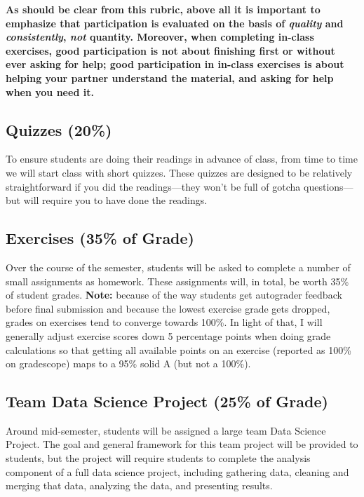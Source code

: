 \documentclass[12pt]{article}
\begin{document}
\textbf{As should be clear from this rubric, above all it is important to emphasize that participation is evaluated on the basis of \emph{quality} and \emph{consistently}, \emph{not} quantity. Moreover, when completing in-class exercises, good participation is not about finishing first or without ever asking for help; good participation in in-class exercises is about helping your partner understand the material, and asking for help when you need it.}

\subsection{Quizzes (20\%)}

To ensure students are doing their readings in advance of class, from time to time we will start class with short quizzes. These quizzes are designed to be relatively straightforward if you did the readings—they won't be full of gotcha questions—but will require you to have done the readings.

\subsection{Exercises (35\% of Grade)}

Over the course of the semester, students will be asked to complete a number of small assignments as homework. These assignments will, in total, be worth 35\% of student grades. \textbf{Note:} because of the way students get autograder feedback before final submission and because the lowest exercise grade gets dropped, grades on exercises tend to converge towards 100\%. In light of that, I will generally adjust exercise scores down 5 percentage points when doing grade calculations so that getting all available points on an exercise (reported as 100\% on gradescope) maps to a 95\% solid A (but not a 100\%).

\subsection{Team Data Science Project  (25\% of Grade)}

Around mid-semester, students will be assigned a large team Data Science Project. The goal and general framework for this team project will be provided to students, but the project will require students to complete the analysis component of a full data science project, including gathering data, cleaning and merging that data, analyzing the data, and presenting results.
\end{document}
